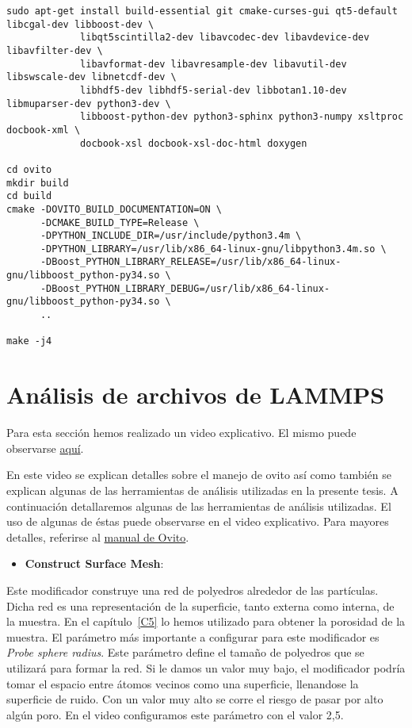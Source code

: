 \begin{lstlisting}
sudo apt-get install build-essential git cmake-curses-gui qt5-default libcgal-dev libboost-dev \
		     libqt5scintilla2-dev libavcodec-dev libavdevice-dev libavfilter-dev \
		     libavformat-dev libavresample-dev libavutil-dev libswscale-dev libnetcdf-dev \
		     libhdf5-dev libhdf5-serial-dev libbotan1.10-dev libmuparser-dev python3-dev \
		     libboost-python-dev python3-sphinx python3-numpy xsltproc docbook-xml \
		     docbook-xsl docbook-xsl-doc-html doxygen
                     
cd ovito
mkdir build
cd build
cmake -DOVITO_BUILD_DOCUMENTATION=ON \
      -DCMAKE_BUILD_TYPE=Release \
      -DPYTHON_INCLUDE_DIR=/usr/include/python3.4m \
      -DPYTHON_LIBRARY=/usr/lib/x86_64-linux-gnu/libpython3.4m.so \
      -DBoost_PYTHON_LIBRARY_RELEASE=/usr/lib/x86_64-linux-gnu/libboost_python-py34.so \
      -DBoost_PYTHON_LIBRARY_DEBUG=/usr/lib/x86_64-linux-gnu/libboost_python-py34.so \
      ..
      
make -j4
\end{lstlisting}

\section{Análisis de archivos de LAMMPS}
\label{AB_2}

Para esta sección hemos realizado un video explicativo. El mismo puede observarse \href{https://youtu.be/iGieWcpcQmQ}{aquí}.

En este video se explican detalles sobre el manejo de ovito así como también se explican algunas de las herramientas de análisis utilizadas en la presente tesis. A continuación detallaremos algunas de las herramientas de análisis utilizadas. El uso de algunas de éstas puede observarse en el video explicativo. Para mayores detalles, referirse al \href{http://www.ovito.org/manual/particles.modifiers.html}{manual de Ovito}.

\begin{itemize}
 \item \textbf{Construct Surface Mesh}:
\end{itemize}
Este modificador construye una red de polyedros alrededor de las partículas. Dicha red es una representación de la superficie, tanto externa como interna, de la muestra. En el capítulo~\ref{C5} lo hemos utilizado para obtener la porosidad de la muestra. El parámetro más importante a configurar para este modificador es \textit{Probe sphere radius}. Este parámetro define el tamaño de polyedros que se utilizará para formar la red. Si le damos un valor muy bajo, el modificador podría tomar el espacio entre átomos vecinos como una superficie, llenandose la superficie de ruido. Con un valor muy alto se corre el riesgo de pasar por alto algún poro. En el video configuramos este parámetro con el valor 2,5.

